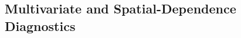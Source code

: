 \documentclass{agujournal2019}
\providecommand{\DIFaddbegin}{} %
\begin{document}



\DIFaddbegin \subsection{Multivariate and Spatial-Dependence Diagnostics}
\label{sec:multivariate}
\end{document}
